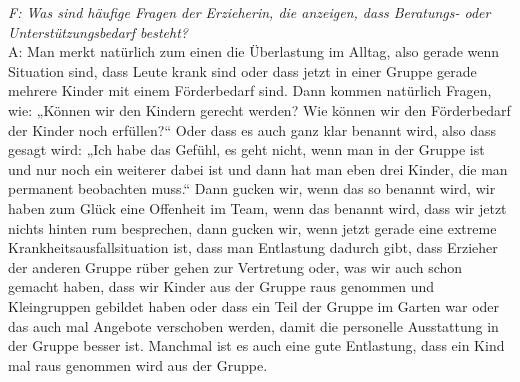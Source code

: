 \begin{linenumbers*}
\emph{F: Was sind häufige Fragen der Erzieherin, die anzeigen, dass Beratungs- oder Unterstützungsbedarf besteht?}\\
A: Man merkt natürlich zum einen die Überlastung im Alltag, also gerade wenn Situation sind, dass Leute krank sind oder dass jetzt in einer Gruppe gerade mehrere Kinder mit einem Förderbedarf sind. Dann kommen natürlich Fragen, wie: „Können wir den Kindern gerecht werden? Wie können wir den Förderbedarf der Kinder noch erfüllen?“ Oder dass es auch ganz klar benannt wird, also dass gesagt wird: „Ich habe das Gefühl, es geht nicht, wenn man in der Gruppe ist und nur noch ein weiterer dabei ist und dann hat man eben drei Kinder, die man permanent beobachten muss.“ Dann gucken wir, wenn das so benannt wird, wir haben zum Glück eine Offenheit im Team, wenn das benannt wird, dass wir jetzt nichts hinten rum besprechen, dann gucken wir, wenn jetzt gerade eine extreme Krankheitsausfallsituation ist, dass man Entlastung dadurch gibt, dass Erzieher der anderen Gruppe rüber gehen zur Vertretung oder, was wir auch schon gemacht haben, dass wir Kinder aus der Gruppe raus genommen und Kleingruppen gebildet haben oder dass ein Teil der Gruppe im Garten war oder das auch mal Angebote verschoben werden, damit die personelle Ausstattung in der Gruppe besser ist. Manchmal ist es auch eine gute Entlastung, dass ein Kind mal raus genommen wird aus der Gruppe.  


\end{linenumbers*}
